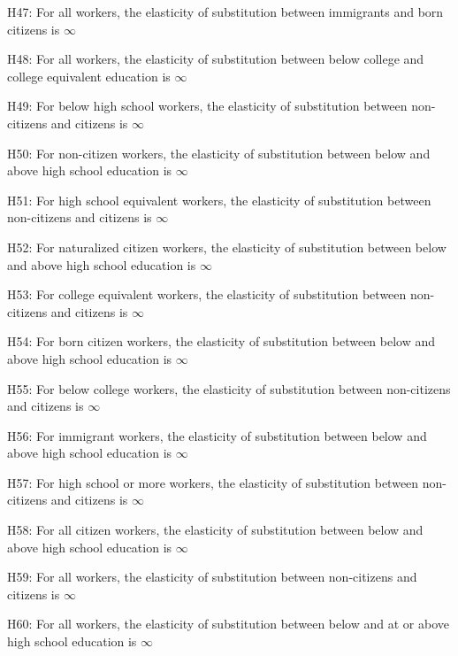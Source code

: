 \documentclass[11pt]{article}
\theoremstyle{definition}
\theoremstyle{remark}
\begin{document}
{H47: For all workers, the elasticity of substitution between immigrants and born citizens is $\infty$

H48: For all workers, the elasticity of substitution between below college and college equivalent education is $\infty$

H49: For below high school workers, the elasticity of substitution between non-citizens and citizens is $\infty$

H50: For non-citizen workers, the elasticity of substitution between below and above high school education is $\infty$

H51: For high school equivalent workers, the elasticity of substitution between non-citizens and citizens is $\infty$

H52: For naturalized citizen workers, the elasticity of substitution between below and above high school education is $\infty$

H53: For college equivalent workers, the elasticity of substitution between non-citizens and citizens is $\infty$

H54: For born citizen workers, the elasticity of substitution between below and above high school education is $\infty$

H55: For below college workers, the elasticity of substitution between non-citizens and citizens is $\infty$

H56: For immigrant workers, the elasticity of substitution between below and above high school education is $\infty$

H57: For high school or more workers, the elasticity of substitution between non-citizens and citizens is $\infty$

H58: For all citizen workers, the elasticity of substitution between below and above high school education is $\infty$

H59: For all workers, the elasticity of substitution between non-citizens and citizens is $\infty$

H60: For all workers, the elasticity of substitution between below and at or above high school education is $\infty$
}


\end{document}
